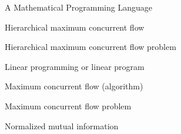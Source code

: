 \item[AMPL] A Mathematical Programming Language~\cite{fourer1989mathematical}
\item[HMCF] Hierarchical maximum concurrent flow
\item[HCMFP] Hierarchical maximum concurrent flow problem
\item[LP] Linear programming or linear program
\item[MCF] Maximum concurrent flow (algorithm)
\item[MCFP] Maximum concurrent flow problem
\item[NMI] Normalized mutual information~\cite{danon2005comparing}
